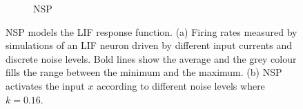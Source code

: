 \begin{figure}[bht!]
\begin{subfigure}[t]{0.7\textwidth}
			\DIFaddendFL \caption{NSP}
		\end{subfigure}
		\caption[NSP models the LIF response function.]{
			NSP models the LIF response function.
			(a) Firing rates measured by simulations of an LIF neuron driven by different input currents and discrete noise levels.
			Bold lines show the average and the grey colour fills the range between the minimum and the maximum.
			(b) NSP activates the input $x$ according to different noise levels where \DIFaddbeginFL {}\DIFaddendFL $k=0.16$.}
		\label{fig:nsp}
	\end{figure}

	
	
